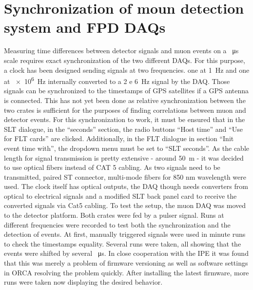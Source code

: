   \section{Synchronization of moun detection system and FPD DAQs}
  \label{ch:Analysis:sec:Synchronisation of moun module and FPD DAQs}
  Measuring time differences between detector signals and muon events on a \SI{}{\micro\second} scale requires exact synchronization of the two different DAQs. For this purpose, a clock has been designed sending signals at two frequencies. one at \SI{1}{\hertz} and one at \SI{e6}{\hertz} internally converted to a \SI{2 e 6}{\hertz} signal by the DAQ. Those signals can be synchronized to the timestamps of GPS satellites if a GPS antenna is connected. This has not yet been done as relative synchronization between the two crates is sufficient for the purposes of finding correlations between muon and detector events. 
  For this synchronization to work, it must be ensured that in the SLT dialogue, in the ``seconds'' section, the radio buttons ``Host time'' and ``Use for FLT cards'' are clicked. Additionally, in the FLT dialogue in section ``Init event time with'', the dropdown menu must be set to ``SLT seconds''.
  As the cable length for signal transmission is pretty extensive - around \SI{50}{\meter} - it was decided to use optical fibers instead of CAT 5 cabling. As two signals need to be transmitted, paired ST connector, multi-mode fibers for 850 nm wavelength were used. The clock itself has optical outputs, the DAQ though needs converters from optical to electrical signals and a modified SLT back panel card to receive the converted signals via Cat5 cabling. To test the setup, the muon DAQ was moved to the detector platform. Both crates were fed by a pulser signal. Runs at different frequencies were recorded to test both the synchronization and the detection of events.
  At first, manually triggered signals were used in minute runs to check the timestamps equality. Several runs were taken, all showing that the events were shifted by several \SI{}{\micro\second}.
  In close cooperation with the IPE it was found that this was merely a problem of firmware versioning as well as software settings in ORCA resolving the problem quickly. After installing the latest firmware, more runs were taken now displaying the desired behavior.
